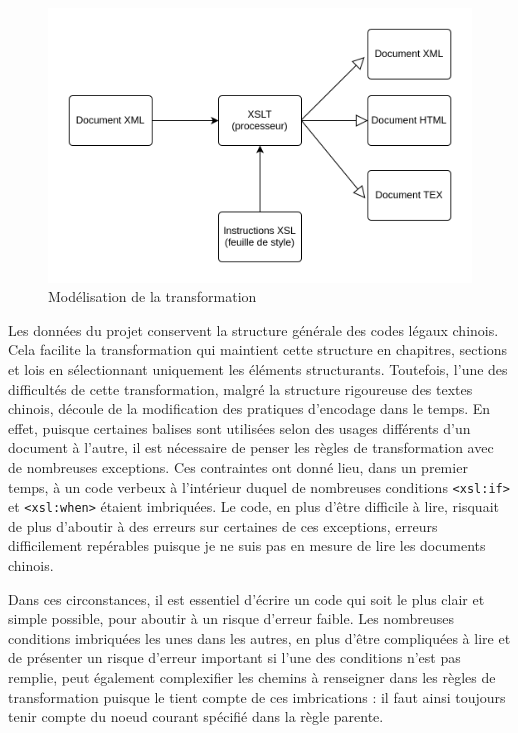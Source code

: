 \begin{figure}
    \centering
    \includegraphics[width=\textwidth]{images/xslt.png}
    \caption{Modélisation de la transformation \XSLT}
\end{figure}

Les données du projet \LSC conservent la structure générale des codes légaux chinois. Cela facilite la transformation \XSLT qui maintient cette structure en chapitres, sections et lois en sélectionnant uniquement les éléments structurants. Toutefois, l'une des difficultés de cette transformation, malgré la structure rigoureuse des textes chinois, découle de la modification des pratiques d'encodage dans le temps. En effet, puisque certaines balises sont utilisées selon des usages différents d'un document à l'autre, il est nécessaire de penser les règles de transformation avec de nombreuses exceptions. Ces contraintes ont donné lieu, dans un premier temps, à un code verbeux à l'intérieur duquel de nombreuses conditions \texttt{<xsl:if>} et \texttt{<xsl:when>} étaient imbriquées. Le code, en plus d'être difficile à lire, risquait de plus d'aboutir à des erreurs sur certaines de ces exceptions, erreurs difficilement repérables puisque je ne suis pas en mesure de lire les documents chinois. 

Dans ces circonstances, il est essentiel d'écrire un code qui soit le plus clair et simple possible, pour aboutir à un risque d'erreur faible. Les nombreuses conditions imbriquées les unes dans les autres, en plus d'être compliquées à lire et de présenter un risque d'erreur important si l'une des conditions n'est pas remplie, peut également complexifier les chemins \xpath à renseigner dans les règles de transformation puisque le \xpath tient compte de ces imbrications : il faut ainsi toujours tenir compte du noeud courant spécifié dans la règle parente. 

